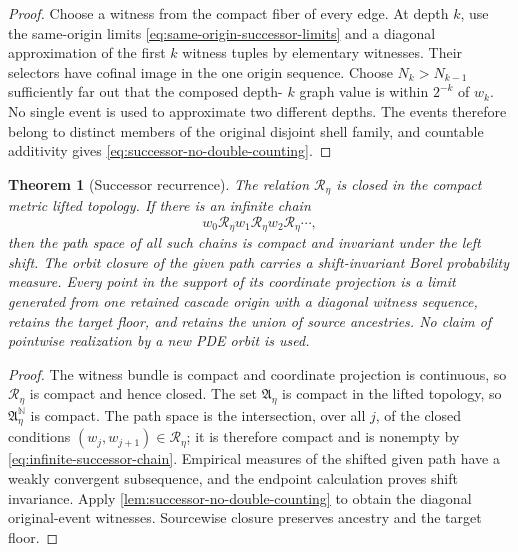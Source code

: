 \documentclass[11pt]{article}
\numberwithin{section}{part}
\theoremstyle{plain}
\newtheorem{theorem}{Theorem}[section]
\theoremstyle{definition}
\theoremstyle{remark}
\begin{document}
\begin{proof}
Choose a witness from the compact fiber of every edge.  At depth \(k\), use
the same-origin limits \eqref{eq:same-origin-successor-limits} and a diagonal
approximation of the first \(k\) witness tuples by elementary witnesses.
Their selectors have cofinal image in the one origin sequence.  Choose
\(N_k>N_{k-1}\) sufficiently far out that the composed depth-
\(k\) graph value is within \(2^{-k}\) of \(w_k\).  No single event is used to
approximate two different depths.  The events therefore belong to distinct
members of the original disjoint shell family, and countable additivity gives
\eqref{eq:successor-no-double-counting}.
\end{proof}

\begin{theorem}[Successor recurrence]
\label{thm:continuum-successor-recurrence}
The relation \(\mathcal R_\eta\) is closed in the compact metric lifted
topology.  If there is an infinite chain
\begin{equation}
 \label{eq:infinite-successor-chain}
 w_0\mathcal R_\eta w_1\mathcal R_\eta w_2\mathcal R_\eta\cdots,
\end{equation}
then the path space of all such chains is compact and invariant under the
left shift.  The orbit closure of the given path carries a shift-invariant
Borel probability measure.  Every point in the support of its coordinate
projection is a limit generated from one retained cascade origin with a
diagonal witness sequence,
retains the target floor, and retains the union of source ancestries.  No claim
of pointwise realization by a new PDE orbit is used.
\end{theorem}

\begin{proof}
The witness bundle is compact and coordinate projection is continuous, so
\(\mathcal R_\eta\) is compact and hence closed.  The set
\(\mathfrak A_\eta\) is compact in the lifted topology,
so \(\mathfrak A_\eta^{\mathbb N}\) is compact.  The path space is the
intersection, over all \(j\), of the closed conditions
\((w_j,w_{j+1})\in\mathcal R_\eta\); it is therefore compact and is nonempty
by \eqref{eq:infinite-successor-chain}.  Empirical measures of the shifted
given path have a weakly convergent subsequence, and the endpoint calculation
proves shift invariance.  Apply
\cref{lem:successor-no-double-counting} to obtain the diagonal original-event
witnesses.  Sourcewise closure preserves ancestry and the target floor.
\end{proof}
\end{document}
